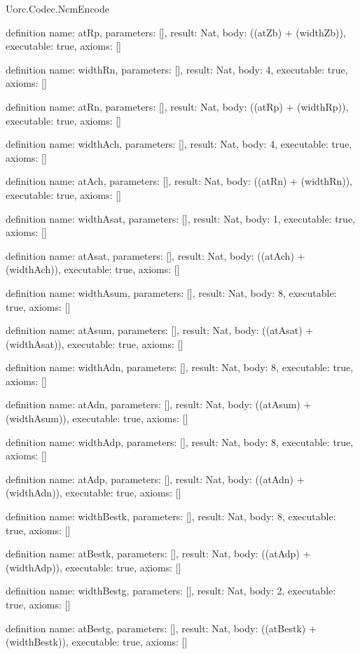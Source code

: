 \begin{lexlean}{Uorc.Codec.NcmEncode}
\begin{semanticmodule}
definition{
  name: atRp,
  parameters: [],
  result: Nat,
  body: ((atZb) + (widthZb)),
  executable: true,
  axioms: []
}

definition{
  name: widthRn,
  parameters: [],
  result: Nat,
  body: 4,
  executable: true,
  axioms: []
}

definition{
  name: atRn,
  parameters: [],
  result: Nat,
  body: ((atRp) + (widthRp)),
  executable: true,
  axioms: []
}

definition{
  name: widthAch,
  parameters: [],
  result: Nat,
  body: 4,
  executable: true,
  axioms: []
}

definition{
  name: atAch,
  parameters: [],
  result: Nat,
  body: ((atRn) + (widthRn)),
  executable: true,
  axioms: []
}

definition{
  name: widthAsat,
  parameters: [],
  result: Nat,
  body: 1,
  executable: true,
  axioms: []
}

definition{
  name: atAsat,
  parameters: [],
  result: Nat,
  body: ((atAch) + (widthAch)),
  executable: true,
  axioms: []
}

definition{
  name: widthAsum,
  parameters: [],
  result: Nat,
  body: 8,
  executable: true,
  axioms: []
}

definition{
  name: atAsum,
  parameters: [],
  result: Nat,
  body: ((atAsat) + (widthAsat)),
  executable: true,
  axioms: []
}

definition{
  name: widthAdn,
  parameters: [],
  result: Nat,
  body: 8,
  executable: true,
  axioms: []
}

definition{
  name: atAdn,
  parameters: [],
  result: Nat,
  body: ((atAsum) + (widthAsum)),
  executable: true,
  axioms: []
}

definition{
  name: widthAdp,
  parameters: [],
  result: Nat,
  body: 8,
  executable: true,
  axioms: []
}

definition{
  name: atAdp,
  parameters: [],
  result: Nat,
  body: ((atAdn) + (widthAdn)),
  executable: true,
  axioms: []
}

definition{
  name: widthBestk,
  parameters: [],
  result: Nat,
  body: 8,
  executable: true,
  axioms: []
}

definition{
  name: atBestk,
  parameters: [],
  result: Nat,
  body: ((atAdp) + (widthAdp)),
  executable: true,
  axioms: []
}

definition{
  name: widthBestg,
  parameters: [],
  result: Nat,
  body: 2,
  executable: true,
  axioms: []
}

definition{
  name: atBestg,
  parameters: [],
  result: Nat,
  body: ((atBestk) + (widthBestk)),
  executable: true,
  axioms: []
}


\end{semanticmodule}
\end{lexlean}
